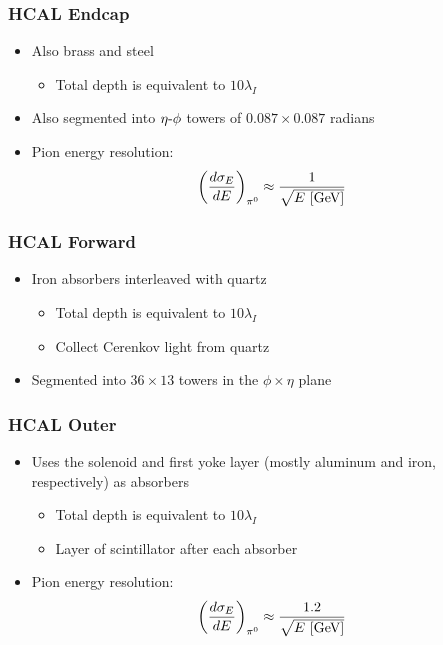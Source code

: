 \subsubsection{HCAL Endcap}
\begin{itemize}
  \item Also brass and steel
  \begin{itemize}
    \item Total depth is equivalent to $10\lambda_I$
  \end{itemize}
  \item Also segmented into $\eta\textto\phi$ towers of $0.087\times0.087$ radians
  \item Pion energy resolution:
  \begin{equation}
    \left(\dfrac{d \sigma_E}{d E}\right)_{\pi^0} \approx \frac{1}{\sqrt{E~[\text{GeV}]}}
  \end{equation}
\end{itemize}


\subsubsection{HCAL Forward}
\begin{itemize}
  \item Iron absorbers interleaved with quartz
  \begin{itemize}
    \item Total depth is equivalent to $10\lambda_I$
    \item Collect Cerenkov light from quartz
  \end{itemize}
  \item Segmented into $36\times13$ towers in the $\phi\times\eta$ plane
\end{itemize}

\subsubsection{HCAL Outer}
\begin{itemize}
  \item Uses the solenoid and first yoke layer (mostly aluminum and iron, respectively) as absorbers 
  \begin{itemize}
    \item Total depth is equivalent to $10\lambda_I$
    \item Layer of scintillator after each absorber
  \end{itemize}
  \item Pion energy resolution:
  \begin{equation}
    \left(\dfrac{d \sigma_E}{d E}\right)_{\pi^0} \approx \frac{1.2}{\sqrt{E~[\text{GeV}]}}
  \end{equation}
\end{itemize}

